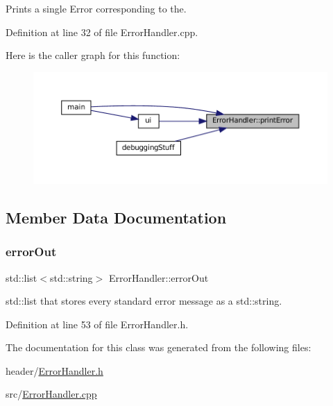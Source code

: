 Prints a single Error corresponding to the. 




Definition at line 32 of file Error\+Handler.\+cpp.

Here is the caller graph for this function\+:
\nopagebreak
\begin{figure}[H]
\begin{center}
\leavevmode
\includegraphics[width=350pt]{classErrorHandler_ab90b8248f24e3129df69d224585956dd_icgraph}
\end{center}
\end{figure}


\subsection{Member Data Documentation}
\mbox{\label{classErrorHandler_aeb3bff116fcb83a58defbef8e8111f0e}} 
\subsubsection{\texorpdfstring{errorOut}{errorOut}}
{\footnotesize\ttfamily std\+::list$<$std\+::string$>$ Error\+Handler\+::error\+Out\hspace{0.3cm}{\ttfamily [private]}}

std\+::list that stores every standard error message as a std\+::string. 

Definition at line 53 of file Error\+Handler.\+h.



The documentation for this class was generated from the following files\+:\begin{DoxyCompactItemize}
\item 
header/\mbox{\hyperlink{ErrorHandler_8h}{Error\+Handler.\+h}}\item 
src/\mbox{\hyperlink{ErrorHandler_8cpp}{Error\+Handler.\+cpp}}\end{DoxyCompactItemize}
